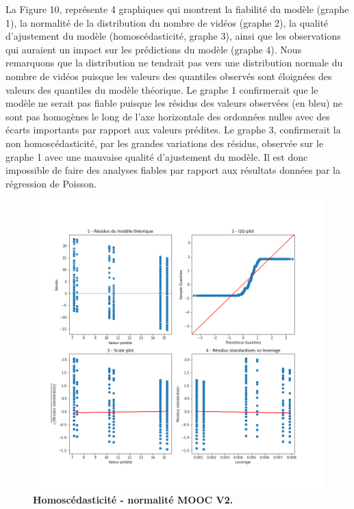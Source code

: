 \documentclass[12pt, a4paper, titlepage, table]{article}
\begin{document}
La Figure 10, représente 4 graphiques qui montrent la fiabilité du modèle (graphe 1), la normalité de la distribution du nombre de vidéos (graphe 2), la qualité d'ajustement du modèle (homoscédasticité, graphe 3),    
ainsi que les observations qui auraient un impact sur les prédictions du modèle (graphe 4).
Nous remarquons que la distribution ne tendrait pas vers une distribution normale du nombre de vidéos puisque les valeurs des quantiles observés sont éloignées des valeurs des quantiles du modèle théorique. Le graphe 1 confirmerait que le modèle ne serait pas fiable puisque les résidus des valeurs observées (en bleu) ne sont pas homogènes le long de l'axe horizontale des ordonnées nulles avec des écarts importants par rapport aux valeurs prédites. Le graphe 3, confirmerait la non homoscédasticité, par les grandes variations des résidus, observée sur le graphe 1 avec une mauvaise qualité d'ajustement du modèle. Il est donc impossible de faire des analyses fiables par rapport aux résultats données par la régression de Poisson.



\begin{figure}[H]
	\centering
	\includegraphics[width=1.2\textwidth]{../../graph/graphs_poisson.png}
	\caption{\textbf{Homoscédasticité - normalité MOOC V2.}}
\end{figure}
\end{document}
